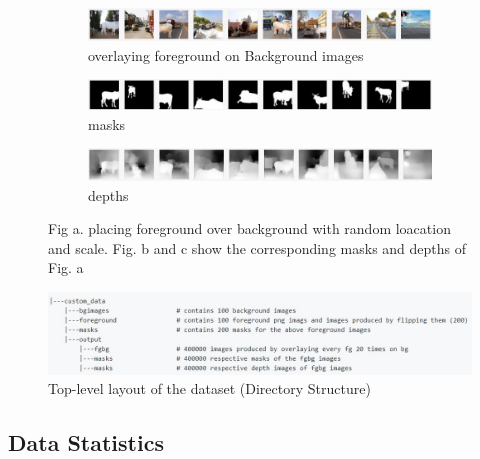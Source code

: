 \documentclass{article}
\begin{document}
\begin{figure}
  \begin{subfigure}{13cm}
    \centering\includegraphics[width=10cm]{overlay.jpg}
    \caption{overlaying foreground on Background images}
  \end{subfigure}
  \begin{subfigure}{13cm}
    \centering\includegraphics[width=10cm]{overlay mask.jpg}
    \caption{masks}
  \end{subfigure}
 
  \begin{subfigure}{13cm}
    \centering\includegraphics[width=10cm]{overlaydepth.jpg}
    \caption{depths}
  \end{subfigure}
  
  \caption{Fig a. placing foreground over background with random loacation and scale. Fig. b and c show the corresponding masks and depths of Fig. a}
  \label{fig:finaldata}
\end{figure}







\begin{figure}[h!]
\centering
  \includegraphics[width=1\textwidth]{layoutofdataset.jpg}
  \caption{Top-level layout of the dataset (Directory Structure)}
  \label{fig:directorystructure}
\end{figure}

\subsection{Data Statistics}
\end{document}
